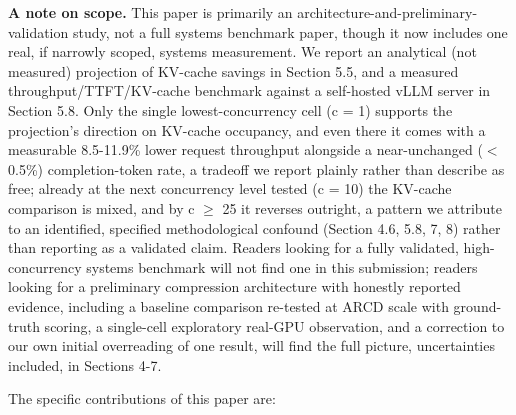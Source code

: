 \textbf{A note on scope.} This paper is primarily an architecture-and-preliminary-validation study, not a full systems benchmark paper, though it now includes one real, if narrowly scoped, systems measurement. We report an analytical (not measured) projection of KV-cache savings in Section 5.5, and a measured throughput/TTFT/KV-cache benchmark against a self-hosted vLLM server in Section 5.8. Only the single lowest-concurrency cell (c = 1) supports the projection's direction on KV-cache occupancy, and even there it comes with a measurable 8.5-11.9\% lower request throughput alongside a near-unchanged ($<$0.5\%) completion-token rate, a tradeoff we report plainly rather than describe as free; already at the next concurrency level tested (c = 10) the KV-cache comparison is mixed, and by c $\geq$ 25 it reverses outright, a pattern we attribute to an identified, specified methodological confound (Section 4.6, 5.8, 7, 8) rather than reporting as a validated claim. Readers looking for a fully validated, high-concurrency systems benchmark will not find one in this submission; readers looking for a preliminary compression architecture with honestly reported evidence, including a baseline comparison re-tested at ARCD scale with ground-truth scoring, a single-cell exploratory real-GPU observation, and a correction to our own initial overreading of one result, will find the full picture, uncertainties included, in Sections 4-7.

The specific contributions of this paper are:

